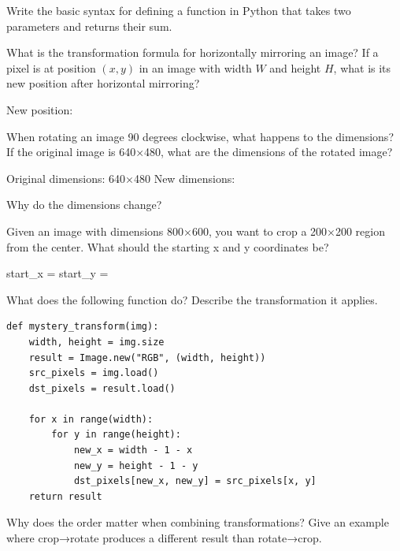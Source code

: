 \documentclass{csexam}
\begin{document}
\begin{questions}

\question[2] Write the basic syntax for defining a function in Python that takes two parameters and returns their sum.
\vspace{1.5in}

\question[3] What is the transformation formula for horizontally mirroring an image? If a pixel is at position $(x, y)$ in an image with width $W$ and height $H$, what is its new position after horizontal mirroring?

\vspace{0.3cm}
New position: \underline{\hspace{3in}}
\vspace{0.8in}

\question[3] When rotating an image 90 degrees clockwise, what happens to the dimensions? If the original image is 640×480, what are the dimensions of the rotated image?

Original dimensions: 640×480 \hspace{0.5in} New dimensions: \underline{\hspace{2in}}

\vspace{0.3cm}
Why do the dimensions change? \underline{\hspace{4in}}
\vspace{0.5in}

\question[2] Given an image with dimensions 800×600, you want to crop a 200×200 region from the center. What should the starting x and y coordinates be?

\vspace{0.3cm}
start\_x = \underline{\hspace{2in}} \hspace{0.5in} start\_y = \underline{\hspace{2in}}

\newpage

\question[3] What does the following function do? Describe the transformation it applies.
\begin{lstlisting}
def mystery_transform(img):
    width, height = img.size
    result = Image.new("RGB", (width, height))
    src_pixels = img.load()
    dst_pixels = result.load()

    for x in range(width):
        for y in range(height):
            new_x = width - 1 - x
            new_y = height - 1 - y
            dst_pixels[new_x, new_y] = src_pixels[x, y]
    return result
\end{lstlisting}

\vspace{1.2in}

\question[2] Why does the order matter when combining transformations? Give an example where crop→rotate produces a different result than rotate→crop.

\vspace{1.5in}

\end{questions}
\end{document}
